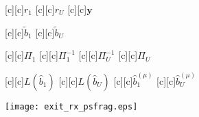 \documentclass{article}
\begin{document}
\begin{figure}[htb]
  \begin{center}



        [c][c]{$r_1$}
	[c]{$r_U$}
	[c]{$\mathrm{\mathbf{y}}$}

        [c][c]{$\tilde{b}_1$}
        [c][c]{$\tilde{b}_U$}


        [c][c]{$\Pi_1$}
        [c][c]{$\Pi_1^{-1}$}
        [c][c]{$\Pi_U^{-1}$}
        [c][c]{$\Pi_U$}

        [c][c]{$L(\hat{b}_1)$}
        [c][c]{$L(\hat{b}_U)$}
        [c][c]{$\hat{b}_1^{(\mu)}$}
        [c][c]{$\hat{b}_U^{(\mu)}$}






    \texttt{[image: exit\_rx\_psfrag.eps]}
    \end{center}
\end{figure}
\end{document}
